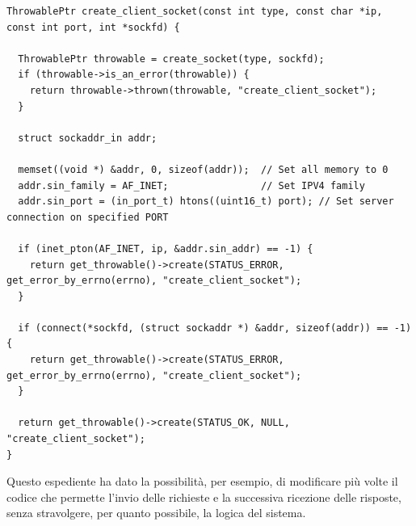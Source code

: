 \documentclass[italian]{tktltiki2}
\begin{document}
\begin{lstlisting}
ThrowablePtr create_client_socket(const int type, const char *ip, const int port, int *sockfd) {

  ThrowablePtr throwable = create_socket(type, sockfd);
  if (throwable->is_an_error(throwable)) {
    return throwable->thrown(throwable, "create_client_socket");
  }

  struct sockaddr_in addr;

  memset((void *) &addr, 0, sizeof(addr));  // Set all memory to 0
  addr.sin_family = AF_INET;                // Set IPV4 family
  addr.sin_port = (in_port_t) htons((uint16_t) port); // Set server connection on specified PORT

  if (inet_pton(AF_INET, ip, &addr.sin_addr) == -1) {
    return get_throwable()->create(STATUS_ERROR, get_error_by_errno(errno), "create_client_socket");
  }

  if (connect(*sockfd, (struct sockaddr *) &addr, sizeof(addr)) == -1) {
    return get_throwable()->create(STATUS_ERROR, get_error_by_errno(errno), "create_client_socket");
  }

  return get_throwable()->create(STATUS_OK, NULL, "create_client_socket");
}
\end{lstlisting}
Questo espediente ha dato la possibilità, per esempio, di modificare più volte il codice che permette l'invio delle richieste e la successiva ricezione delle risposte, senza stravolgere, per quanto possibile, la logica del sistema.
\end{document}
